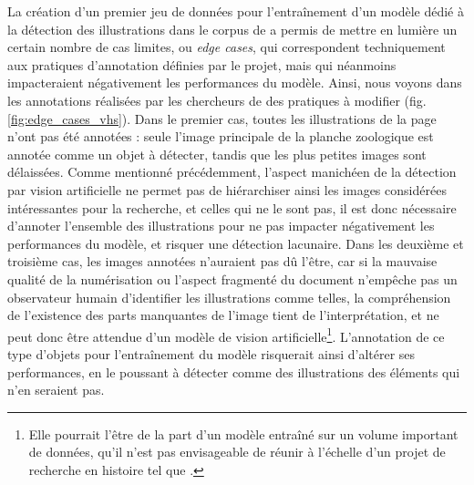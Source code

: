 	La création d'un premier jeu de données pour l'entraînement d'un modèle dédié à la détection des illustrations dans le corpus de \vhs a permis de mettre en lumière un certain nombre de cas limites, ou \textit{edge cases}, qui correspondent techniquement aux pratiques d'annotation définies par le projet, mais qui néanmoins impacteraient négativement les performances du modèle. Ainsi, nous voyons dans les annotations réalisées par les chercheurs de \vhs des pratiques à modifier (fig. \ref{fig:edge_cases_vhs}). Dans le premier cas, toutes les illustrations de la page n'ont pas été annotées : seule l'image principale de la planche zoologique est annotée comme un objet à détecter, tandis que les plus petites images sont délaissées. Comme mentionné précédemment, l'aspect manichéen de la détection par vision artificielle ne permet pas de hiérarchiser ainsi les images considérées intéressantes pour la recherche, et celles qui ne le sont pas, il est donc nécessaire d'annoter l'ensemble des illustrations pour ne pas impacter négativement les performances du modèle, et risquer une détection lacunaire. Dans les deuxième et troisième cas, les images annotées n'auraient pas dû l'être, car si la mauvaise qualité de la numérisation ou l'aspect fragmenté du document n'empêche pas un observateur humain d'identifier les illustrations comme telles, la compréhension de l'existence des parts manquantes de l'image tient de l'interprétation, et ne peut donc être attendue d'un modèle de vision artificielle\footnote{Elle pourrait l'être de la part d'un modèle entraîné sur un volume important de données, qu'il n'est pas envisageable de réunir à l'échelle d'un projet de recherche en histoire tel que \vhs.}. L'annotation de ce type d'objets pour l'entraînement du modèle risquerait ainsi d'altérer ses performances, en le poussant à détecter comme des illustrations des éléments qui n'en seraient pas.

